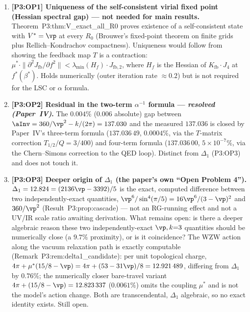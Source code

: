 \begin{enumerate}[label=,leftmargin=*]
\item \textbf{[P3:OP1] Uniqueness of the self-consistent virial fixed point (Hessian spectral gap) --- not needed for main results.}
Theorem~P3:thm:V\_exact\_all\_R0 proves existence of a self-consistent state
with $V^*=\vp$ at every $R_0$ (Brouwer's fixed-point theorem on finite grids
plus Rellich--Kondrachov compactness). Uniqueness would follow from showing
the feedback map $T$ is a contraction: $\mu^*\cdot\|\partial^2 J_{\mathrm{fb}}/\partial f^2\|
< \lambda_{\min}(H_f)\cdot J_{\mathrm{fb},2}$, where $H_f$ is the Hessian of
$K_{\mathrm{fb}}\cdot J_4$ at $f^*(\beta^*)$. Holds numerically (outer
iteration rate ${\approx}0.2$) but is not required for the LSC or $\alpha$ formula.

\item \textbf{[P3:OP2] Residual in the two-term $\alpha^{-1}$ formula --- \emph{resolved (Paper~IV)}.}
The $0.004\%$ ($0.006$ absolute) gap between $\aInv=360/\vp^2-k/(2\pi)=137.030$
and the measured $137.036$ is closed by Paper~IV's three-term formula
($137.036\,49$, $0.0004\%$, via the $T$-matrix correction $T_{1/2}/Q=3/400$)
and four-term formula ($137.036\,00$, $5\times10^{-7}\%$, via the
Chern--Simons correction to the QED loop). Distinct from $\Delta_1$
(P3:OP3) and does not touch it.

\item \textbf{[P3:OP3] Deeper origin of $\Delta_1$ (the paper's own ``Open Problem 4'').}
$\Delta_1=12.824=(2136\vp-3392)/5$ is the exact, computed difference between
two independently-exact quantities, $\vp^6/\sin^4(\pi/5)=16\vp^6/(3-\vp)^2$
and $360/\vp^2$ (Result~P3:prop:cascade) --- not an RG-running effect and not
a UV/IR scale ratio awaiting derivation. What remains open: is there a deeper
algebraic reason these two independently-exact $\vp,k{=}3$ quantities should be
numerically close (a $9.7\%$ proximity), or is it coincidence?
The WZW action along the vacuum relaxation path is exactly computable
(Remark~P3:rem:delta1\_candidate): per unit topological charge,
$4\pi+\mu^*(15/8-\vp)=4\pi+(53-31\vp)/8=12.921\,489$, differing from
$\Delta_1$ by $0.76\%$; the numerically closer bare-travel variant
$4\pi+(15/8-\vp)=12.823\,337$ ($0.0061\%$) omits the coupling $\mu^*$ and is
not the model's action change. Both are transcendental, $\Delta_1$ algebraic,
so no exact identity exists. Still open.


\end{enumerate}
